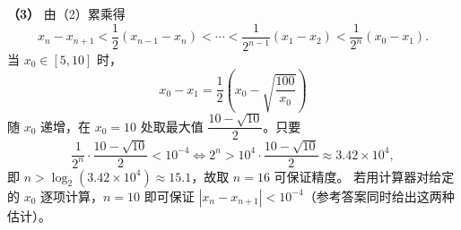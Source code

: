 \begin{answer}
\textbf{（3）}
由（2）累乘得
\nopagebreak[4]
\[x_n-x_{n+1}<\frac12(x_{n-1}-x_n)<\cdots<\frac1{2^{n-1}}(x_1-x_2)<\frac1{2^n}(x_0-x_1).\]
当 $x_0\in[5,10]$ 时，
\nopagebreak[4]
\[x_0-x_1=\frac12\left(x_0-\sqrt{\frac{100}{x_0}}\right)\]
随 $x_0$ 递增，在 $x_0=10$ 处取最大值 $\dfrac{10-\sqrt{10}}2$。只要
\nopagebreak[4]
\[\frac1{2^n}\cdot\frac{10-\sqrt{10}}2<10^{-4}\iff2^n>10^4\cdot\frac{10-\sqrt{10}}2\approx3.42\times10^4,\]
即 $n>\log_2(3.42\times10^4)\approx15.1$，故取 $n=16$ 可保证精度。
若用计算器对给定的 $x_0$ 逐项计算，$n=10$ 即可保证 $|x_n-x_{n+1}|<10^{-4}$（参考答案同时给出这两种估计）。




\end{answer}